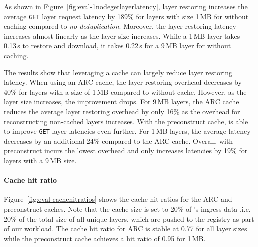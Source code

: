 %
As shown in Figure~\ref{fig:eval-1nodegetlayerlatency}, 
layer restoring increases the average \texttt{GET} layer request latency by 189\% for layers 
with size 1\,MB for \sysname without caching compared to \emph{no deduplication}.
%
Moreover, the layer restoring latency increases almost linearly as the layer size increases.
%
While a 1\,MB layer takes 0.13\,s to restore and download, 
it takes 0.22\,s for a 9\,MB layer for \sysname without caching.

%
The results show that
leveraging a cache can largely reduce layer restoring latency.
%
When using an ARC cache, the layer restoring overhead decreases by 40\% for layers with
a size of 1\,MB compared to \sysname without cache.
%
However, as the layer size increases,  the improvement drops.
%
For 9\,MB layers, the ARC cache reduces the average layer restoring overhead by only 16\%
as the overhead for reconstructing non-cached layers increases.
%
%
With the preconstruct cache, \sysname is able to improve \texttt{GET} layer latencies even further.
%
For 1\,MB layers, the average latency decreases by an additional 24\% compared to the ARC cache.
%
Overall, \sysname with preconstruct incurs the lowest overhead and only increases latencies by
19\% for layers with a 9\,MB size. 

\paragraph{Cache hit ratio}
%
Figure~\ref{fig:eval-cachehitratios} shows the cache hit ratios for the ARC and
preconstruct caches.
%
Note that the cache size is set to 20\% of \dal{}'s ingress data ,i.e. 20\% of the total size of
all unique layers, which are pushed to the registry as part of our workload.
%
%
%
The cache hit ratio for ARC is stable at 0.77 for all layer sizes while
the preconstruct cache achieves a hit ratio of 0.95 for 1\,MB.

